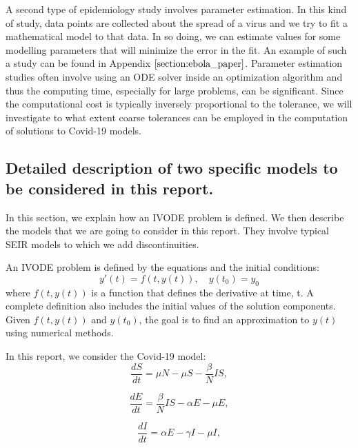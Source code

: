 A second type of epidemiology study involves parameter estimation. In this kind of study, data points are collected about the spread of a virus and we try to fit a mathematical model to that data. In so doing, we can estimate values for some modelling parameters that will minimize the error in the fit. An example of such a study can be found in Appendix $\ref{section:ebola_paper}$. Parameter estimation studies often involve using an ODE solver inside an optimization algorithm and thus the computing time, especially for large problems, can be significant. Since the computational cost is typically inversely proportional to the tolerance, we will investigate to what extent coarse tolerances can be employed in the computation of solutions to Covid-19 models.

\subsection{Detailed description of two specific models to be considered in this report.} 
\label{subsection:SEIR_model}
In this section, we explain how an IVODE problem is defined. We then describe the models that we are going to consider in this report. They involve typical SEIR models to which we add discontinuities.

An IVODE problem is defined by the equations and the initial conditions:
\begin{equation}
y'(t) = f(t, y(t)), \quad y(t_0) = y_0 \nonumber
\end{equation}
where $f(t, y(t))$ is a function that defines the derivative at time, t. A complete definition also includes the initial values of the solution components. Given $f(t, y(t))$ and $y(t_0)$, the goal is to find an approximation to  $y(t)$ using numerical methods. 

In this report, we consider the Covid-19 model:
\begin{equation}
\frac{\textit{d}S}{\textit{dt}} = \mu N - \mu S - \frac{\beta}{N}IS, \nonumber
\end{equation}

\begin{equation}
\frac{\textit{d}E}{\textit{dt}} = \frac{\beta}{N}IS - \alpha E - \mu E, \nonumber
\end{equation}

\begin{equation}
\frac{\textit{d}I}{\textit{dt}} = \alpha E - \gamma I - \mu I, \nonumber
\end{equation}

